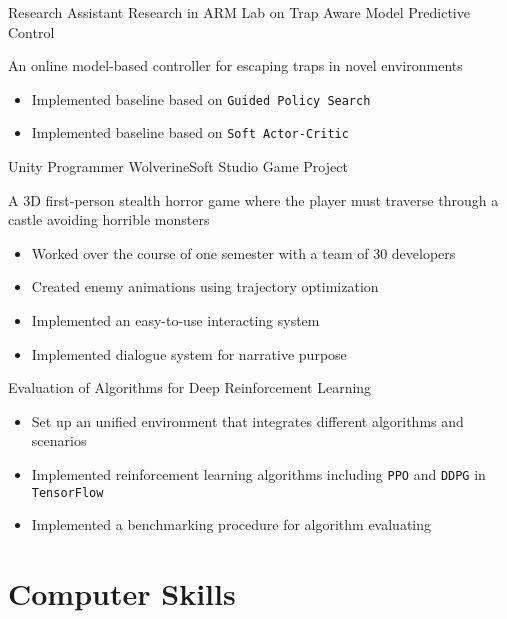 \documentclass[10pt, a4paper, sans]{moderncv}
\begin{document}
{Research Assistant}
{Research in ARM Lab on Trap Aware Model Predictive Control}
{}{}
{An online model-based controller for escaping traps in novel environments
	\begin{itemize}
		\item Implemented baseline based on \texttt{Guided Policy Search}
		\item Implemented baseline based on \texttt{Soft Actor-Critic}
	\end{itemize}
}

{Unity Programmer}
{WolverineSoft Studio Game Project}
{}{}
{A 3D first-person stealth horror game where the player must traverse through a castle avoiding horrible monsters
	\begin{itemize}
		\item Worked over the course of one semester with a team of 30 developers
		\item Created enemy animations using trajectory optimization
		\item Implemented an easy-to-use interacting system
		\item Implemented dialogue system for narrative purpose
	\end{itemize}
}

{{Evaluation of Algorithms for Deep Reinforcement Learning}
	\begin{itemize}
		\item Set up an unified environment that integrates different algorithms and scenarios
		\item Implemented reinforcement learning algorithms including \texttt{PPO} and \texttt{DDPG} in \texttt{TensorFlow}
		\item Implemented a benchmarking procedure for algorithm evaluating
	\end{itemize}
}


\section{Computer Skills}
\end{document}
